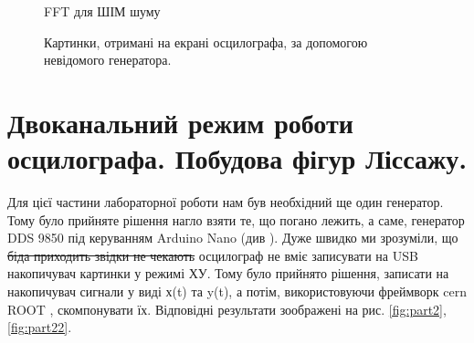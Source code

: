 \begin{figure}[h]
\begin{minipage}[h]{0.47\linewidth}
		 FFT для ШІМ шуму\\
	\end{minipage}
	\caption{Картинки, отримані на екрані осцилографа, за допомогою невідомого генератора.}
	\label{fig:part1}
\end{figure}

\section{Двоканальний режим роботи осцилографа. Побудова фігур Ліссажу.}

Для цієї частини лабораторної роботи нам був необхідний ще один генератор. Тому було прийняте рішення нагло взяти те, що погано лежить, а саме, генератор DDS 9850 під керуванням Arduino Nano (див \cite{lab3}). Дуже швидко ми зрозуміли, що \sout{біда приходить звідки не чекають} осцилограф не вміє записувати на USB накопичувач картинки у режимі ХУ. Тому було прийнято рішення, записати на накопичувач сигнали у виді х(t) та y(t), а потім, використовуючи фреймворк cern ROOT \cite{root}, скомпонувати їх. Відповідні результати зоображені на рис. \ref{fig:part2},\ref{fig:part22}.

